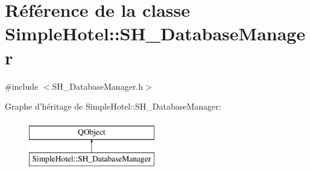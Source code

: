 \hypertarget{classSimpleHotel_1_1SH__DatabaseManager}{\section{Référence de la classe Simple\-Hotel\-:\-:S\-H\-\_\-\-Database\-Manager}
\label{classSimpleHotel_1_1SH__DatabaseManager}
}


{\ttfamily \#include $<$S\-H\-\_\-\-Database\-Manager.\-h$>$}

Graphe d'héritage de Simple\-Hotel\-:\-:S\-H\-\_\-\-Database\-Manager\-:\begin{figure}[H]
\begin{center}
\leavevmode
\includegraphics[height=2.000000cm]{classSimpleHotel_1_1SH__DatabaseManager}
\end{center}
\end{figure}
